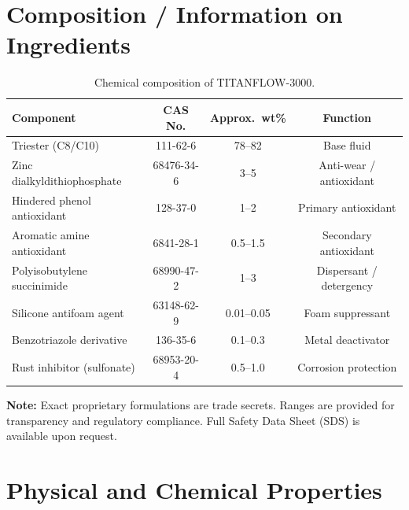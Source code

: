 \documentclass[
    language=english,
    doctype=data-sheet,
    institution=none,
]{../../omnilatex}
\begin{document}
\section{Composition / Information on Ingredients}
\label{sec:composition}

\begin{table}[htbp]
    \centering
    \caption{Chemical composition of TITANFLOW-3000.}
    \label{tab:composition}
    \begin{tabular}{@{}lccc@{}}
        \toprule
        Component & CAS No. & Approx.\ wt\% & Function \\
        \midrule
        Triester (C8/C10) & 111-62-6 & 78--82 & Base fluid \\
        Zinc dialkyldithiophosphate & 68476-34-6 & 3--5 & Anti-wear / antioxidant \\
        Hindered phenol antioxidant & 128-37-0 & 1--2 & Primary antioxidant \\
        Aromatic amine antioxidant & 6841-28-1 & 0.5--1.5 & Secondary antioxidant \\
        Polyisobutylene succinimide & 68990-47-2 & 1--3 & Dispersant / detergency \\
        Silicone antifoam agent & 63148-62-9 & 0.01--0.05 & Foam suppressant \\
        Benzotriazole derivative & 136-35-6 & 0.1--0.3 & Metal deactivator \\
        Rust inhibitor (sulfonate) & 68953-20-4 & 0.5--1.0 & Corrosion protection \\
        \bottomrule
    \end{tabular}
\end{table}

\textbf{Note:} Exact proprietary formulations are trade secrets. Ranges
are provided for transparency and regulatory compliance. Full Safety
Data Sheet (SDS) is available upon request.

\section{Physical and Chemical Properties}
\label{sec:properties}
\end{document}
